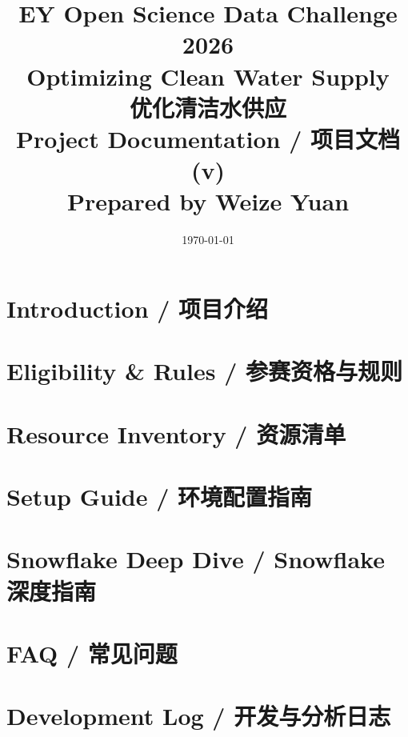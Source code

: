 \documentclass[a4paper,12pt]{report}
\title{
    \vspace{2cm}
    \textbf{\Huge EY Open Science Data Challenge 2026}\\[0.5cm]
    \textbf{\Large Optimizing Clean Water Supply}\\[0.5cm]
    \textbf{\Large 优化清洁水供应}\\[2cm]
    \large \textbf{Project Documentation / 项目文档 (v\unskip)}\\[0.5cm]
    \large Prepared by Weize Yuan
    \vfill
}
\author{}
\date{\today}
\begin{document}
\maketitle
\tableofcontents

\chapter{Introduction / 项目介绍}


\chapter{Eligibility \& Rules / 参赛资格与规则}


\chapter{Resource Inventory / 资源清单}


\chapter{Setup Guide / 环境配置指南}


\chapter{Snowflake Deep Dive / Snowflake 深度指南}


\chapter{FAQ / 常见问题}


\chapter{Development Log / 开发与分析日志}

\end{document}
